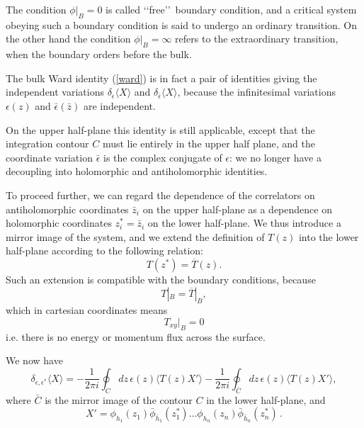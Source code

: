 \documentclass[a4paper,12pt]{report}
\begin{document}
The condition $\phi|_{B}=0$ is called \lq\lq free\rq\rq\, boundary condition, and a critical system obeying such a
boundary condition is said to undergo an ordinary transition. On the other hand the condition $\phi|_{B}=\infty$
refers to the extraordinary transition, when the boundary orders before the bulk.

\vspace{0.5cm}

The bulk Ward identity (\ref{ward}) is in fact a pair of identities giving the independent variations
$\delta_{\epsilon}\langle X\rangle$ and $\delta_{\bar{\epsilon}}\langle X\rangle$, because the infinitesimal
variations $\epsilon(z)$ and $\bar{\epsilon}(\bar{z})$ are independent.

On the upper half-plane this identity is still applicable, except that the integration contour $C$ must lie
entirely in the upper half plane, and the coordinate variation $\bar{\epsilon}$ is the complex conjugate of
$\epsilon$: we no longer have a decoupling into holomorphic and antiholomorphic identities.

To proceed further, we can regard the dependence of the correlators on antiholomorphic coordinates $\bar{z}_{i}$
on the upper half-plane as a dependence on holomorphic coordinates $z_{i}^{*}=\bar{z}_{i}$ on the lower
half-plane. We thus introduce a mirror image of the system, and we extend the definition of $T(z)$ into the lower
half-plane according to the following relation:
\begin{equation}
T(z^{*})=\overline{T}(z).
\end{equation}
Such an extension is compatible with the boundary conditions, because
\begin{equation}
T|_{B}=\overline{T}|_{B},
\end{equation}
which in cartesian coordinates means
\begin{equation}
T_{xy}|_{B}=0
\end{equation}
i.e. there is no energy or momentum flux across the surface.

We now have
\begin{equation}
\delta_{\epsilon,\epsilon^{*}}\langle X\rangle=-\frac{1}{2\pi i}\oint_{C}dz\,\epsilon(z)\langle T(z)X'\rangle
-\frac{1}{2\pi i}\oint_{\bar{C}}dz\,\epsilon(z)\langle T(z)X'\rangle,
\end{equation}
where $\bar{C}$ is the mirror image of the contour $C$ in the lower half-plane, and
\begin{equation}
X'=\phi_{h_{1}}(z_{1})\bar{\phi}_{\bar{h}_{1}}(z_{1}^{*})\ldots
\phi_{h_{n}}(z_{n})\bar{\phi}_{\bar{h}_{n}}(z_{n}^{*})\,.
\end{equation}
\end{document}
